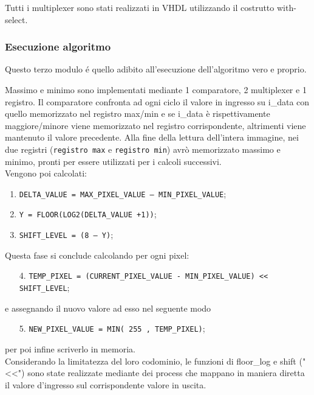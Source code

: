 Tutti i multiplexer sono stati realizzati in VHDL utilizzando il costrutto with-select.


\subsubsection{Esecuzione algoritmo}
Questo terzo modulo é quello adibito all'esecuzione dell'algoritmo vero e proprio.

Massimo e minimo sono implementati mediante 1 comparatore, 2 multiplexer e 1 registro.
Il comparatore confronta ad ogni ciclo il valore in ingresso su i\_data con quello memorizzato nel registro max/min e se i\_data è rispettivamente maggiore/minore viene memorizzato nel registro corrispondente, altrimenti viene mantenuto il valore precedente.
Alla fine della lettura dell'intera immagine, nei due registri (\texttt{registro max} e \texttt{registro min}) avrò memorizzato massimo e minimo, pronti per essere utilizzati per i calcoli successivi.\\

Vengono poi calcolati:

\begin{enumerate}
    \item \texttt{DELTA\_VALUE = MAX\_PIXEL\_VALUE – MIN\_PIXEL\_VALUE};
    \item \texttt{Y = FLOOR(LOG2(DELTA\_VALUE +1))};
    \item \texttt{SHIFT\_LEVEL = (8 – Y)};
\end{enumerate}


Questa fase si conclude calcolando per ogni pixel:
\begin{enumerate}
    \item[4.]  \texttt{TEMP\_PIXEL = (CURRENT\_PIXEL\_VALUE - MIN\_PIXEL\_VALUE) << SHIFT\_LEVEL};
\end{enumerate}

e assegnando il nuovo valore ad esso nel seguente modo
\begin{enumerate}
    \item[5.]   \texttt{NEW\_PIXEL\_VALUE = MIN( 255 , TEMP\_PIXEL)};
\end{enumerate}





per poi infine scriverlo in memoria.\\

Considerando la limitatezza del loro codominio, le funzioni di floor\_log e shift ("<<") sono state realizzate mediante dei process che mappano in maniera diretta il valore d'ingresso sul corrispondente valore in uscita.


